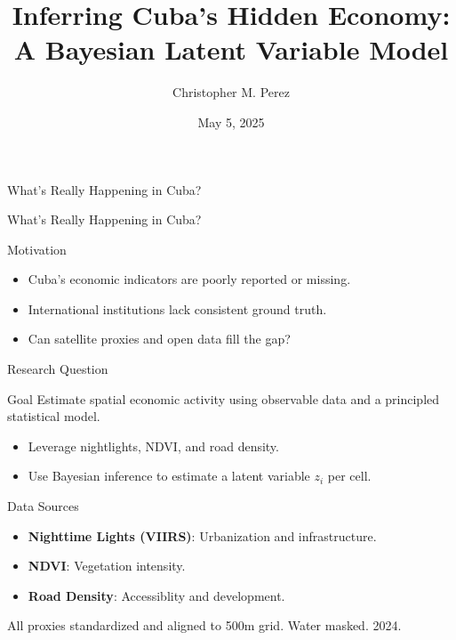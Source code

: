 \documentclass{beamer}
\title{Inferring Cuba's Hidden Economy: A Bayesian Latent Variable Model}
\author{Christopher M. Perez}
\date{May 5, 2025}
\begin{document}
\begin{frame}
  \titlepage
\end{frame}

\begin{frame}{What's Really Happening in Cuba?}
  \centering
   \\[1em]
\end{frame}

\begin{frame}{What's Really Happening in Cuba?}
  \centering
\end{frame}


\begin{frame}{Motivation}
  \begin{itemize}
    \item Cuba's economic indicators are poorly reported or missing.
    \item International institutions lack consistent ground truth.
    \item Can satellite proxies and open data fill the gap?
  \end{itemize}
\end{frame}

  
\begin{frame}{Research Question}
  \begin{block}{Goal}
  Estimate spatial economic activity using observable data and a principled statistical model.
  \end{block}
  \pause
  \begin{itemize}
    \item Leverage nightlights, NDVI, and road density.
    \item Use Bayesian inference to estimate a latent variable $z_i$ per cell.
  \end{itemize}
  \end{frame}
  
\begin{frame}{Data Sources}
\begin{itemize}
    \item \textbf{Nighttime Lights (VIIRS)}: Urbanization and infrastructure.
    \item \textbf{NDVI}: Vegetation intensity.
  \item \textbf{Road Density}: Accessiblity and development.
\end{itemize}
\pause
All proxies standardized and aligned to 500m grid. Water masked. 2024.
\end{frame}
\end{document}
